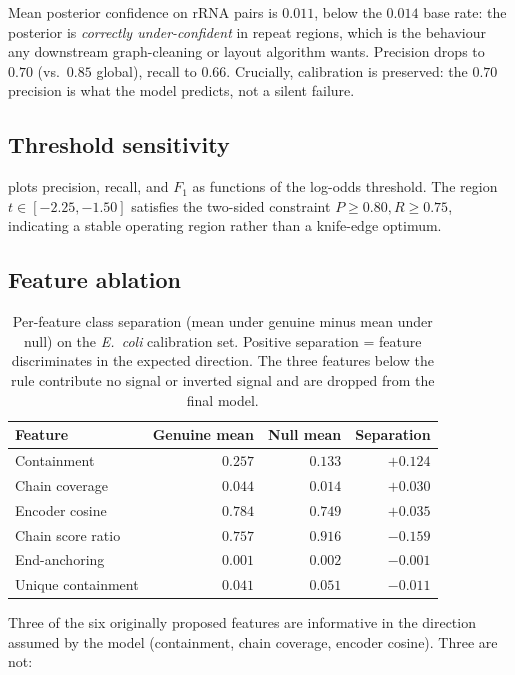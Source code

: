 \documentclass[11pt]{article}
\begin{document}
Mean posterior confidence on rRNA pairs is $0.011$, below the $0.014$ base
rate: the posterior is \emph{correctly under-confident} in repeat regions,
which is the behaviour any downstream graph-cleaning or layout algorithm
wants. Precision drops to $0.70$ (vs.\ $0.85$ global), recall to $0.66$.
Crucially, calibration is preserved: the $0.70$ precision is what the
model predicts, not a silent failure.

\subsection{Threshold sensitivity}

 plots precision, recall, and $F_1$ as functions of
the log-odds threshold. The region $t \in [-2.25, -1.50]$ satisfies the
two-sided constraint $P \ge 0.80, R \ge 0.75$, indicating a stable
operating region rather than a knife-edge optimum.

\subsection{Feature ablation}
\label{sec:ablation}

\begin{table}[h]
\centering
\caption{Per-feature class separation (mean under genuine minus mean under
null) on the \textit{E.\ coli} calibration set. Positive separation =
feature discriminates in the expected direction. The three features below
the rule contribute no signal or inverted signal and are dropped from the
final model.}
\label{tab:ablation}
\begin{tabular}{lrrr}
\toprule
Feature & Genuine mean & Null mean & Separation \\
\midrule
Containment           & $0.257$ & $0.133$ & $+0.124$ \\
Chain coverage        & $0.044$ & $0.014$ & $+0.030$ \\
Encoder cosine        & $0.784$ & $0.749$ & $+0.035$ \\
\midrule
Chain score ratio     & $0.757$ & $0.916$ & $-0.159$ \\
End-anchoring         & $0.001$ & $0.002$ & $-0.001$ \\
Unique containment    & $0.041$ & $0.051$ & $-0.011$ \\
\bottomrule
\end{tabular}
\end{table}

Three of the six originally proposed features are informative in the
direction assumed by the model (containment, chain coverage, encoder
cosine). Three are not:
\end{document}
